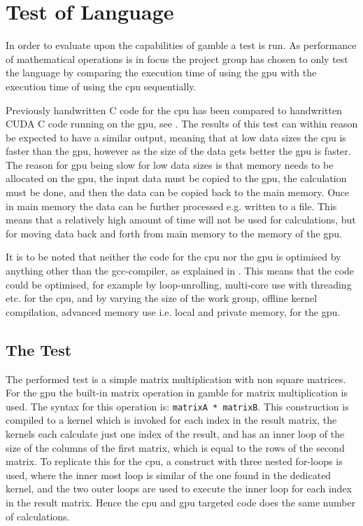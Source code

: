 \chapter{Test of Language} %
\label{cha:test_of_language}
In order to evaluate upon the capabilities of \gls{gamble} a test is run. 
As performance of mathematical operations is in focus the project group has chosen to only test the language by comparing the execution time of using the \gls{gpu} with the execution time of using the \gls{cpu} sequentially.

Previously handwritten C code for the \gls{cpu} has been compared to handwritten CUDA C code running on the \gls{gpu}, see .
The results of this test can within reason be expected to have a similar output, meaning that at low data sizes the \gls{cpu} is faster than the \gls{gpu}, however as the size of the data gets better the \gls{gpu} is faster.
The reason for \gls{gpu} being slow for low data sizes is that memory needs to be allocated on the \gls{gpu}, the input data must be copied to the \gls{gpu}, the calculation must be done, and then the data can be copied back to the main memory. 
Once in main memory the data can be further processed e.g. written to a file. 
This means that a relatively high amount of time will not be used for calculations, but for moving data back and forth from main memory to the memory of the \gls{gpu}.

It is to be noted that neither the code for the \gls{cpu} nor the \gls{gpu} is optimised by anything other than the gcc-compiler, as explained in . 
This means that the code could be optimised, for example by loop-unrolling, multi-core use with threading etc. for the \gls{cpu}, and by varying the size of the work group, offline kernel compilation, advanced memory use i.e. local and private memory, for the \gls{gpu}.  

\section{The Test} %
\label{sec:the_test}
The performed test is a simple matrix multiplication with non square matrices.
For the \gls{gpu} the built-in matrix operation in \gls{gamble} for matrix multiplication is used. The syntax for this operation is: \texttt{matrixA * matrixB}. 
This construction is compiled to a kernel which is invoked for each index in the result matrix, the kernels each calculate just one index of the result, and has an inner loop of the size of the columns of the first matrix, which is equal to the rows of the second matrix.
To replicate this for the \gls{cpu}, a construct with three nested for-loops is used, where the inner most loop is similar of the one found in the dedicated kernel, and the two outer loops are used to execute the inner loop for each index in the result matrix.
Hence the \gls{cpu} and \gls{gpu} targeted code does the same number of calculations.
 
